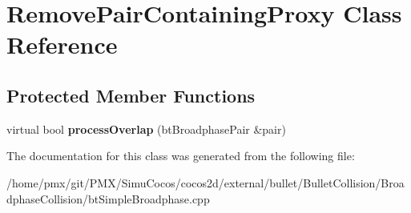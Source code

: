 \hypertarget{classRemovePairContainingProxy}{}\section{Remove\+Pair\+Containing\+Proxy Class Reference}
\label{classRemovePairContainingProxy}
\subsection*{Protected Member Functions}
\begin{DoxyCompactItemize}
\item 
\mbox{\label{classRemovePairContainingProxy_ab8aa857d28e1f4e89a87634373ae3c5a}} 
virtual bool {\bfseries process\+Overlap} (bt\+Broadphase\+Pair \&pair)
\end{DoxyCompactItemize}


The documentation for this class was generated from the following file\+:\begin{DoxyCompactItemize}
\item 
/home/pmx/git/\+P\+M\+X/\+Simu\+Cocos/cocos2d/external/bullet/\+Bullet\+Collision/\+Broadphase\+Collision/bt\+Simple\+Broadphase.\+cpp\end{DoxyCompactItemize}
